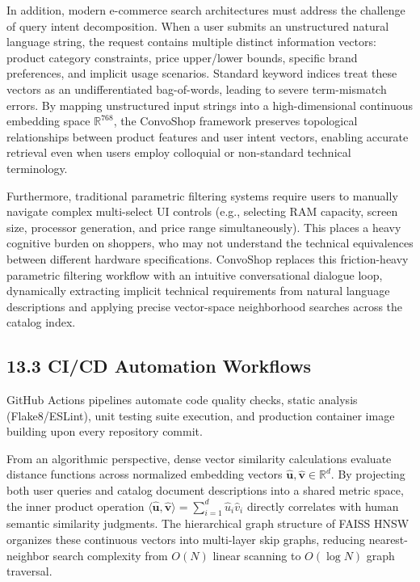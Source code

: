 \documentclass[12pt,a4paper]{article}
\begin{document}
In addition, modern e-commerce search architectures must address the challenge of query intent decomposition. When a user submits an unstructured natural language string, the request contains multiple distinct information vectors: product category constraints, price upper/lower bounds, specific brand preferences, and implicit usage scenarios. Standard keyword indices treat these vectors as an undifferentiated bag-of-words, leading to severe term-mismatch errors. By mapping unstructured input strings into a high-dimensional continuous embedding space $\mathbb{R}^{768}$, the ConvoShop framework preserves topological relationships between product features and user intent vectors, enabling accurate retrieval even when users employ colloquial or non-standard technical terminology.

Furthermore, traditional parametric filtering systems require users to manually navigate complex multi-select UI controls (e.g., selecting RAM capacity, screen size, processor generation, and price range simultaneously). This places a heavy cognitive burden on shoppers, who may not understand the technical equivalences between different hardware specifications. ConvoShop replaces this friction-heavy parametric filtering workflow with an intuitive conversational dialogue loop, dynamically extracting implicit technical requirements from natural language descriptions and applying precise vector-space neighborhood searches across the catalog index.

\subsection*{13.3 CI/CD Automation Workflows}
\label{sec:13.3}
GitHub Actions pipelines automate code quality checks, static analysis (Flake8/ESLint), unit testing suite execution, and production container image building upon every repository commit.



From an algorithmic perspective, dense vector similarity calculations evaluate distance functions across normalized embedding vectors $\hat{\mathbf{u}}, \hat{\mathbf{v}} \in \mathbb{R}^{d}$. By projecting both user queries and catalog document descriptions into a shared metric space, the inner product operation $\langle \hat{\mathbf{u}}, \hat{\mathbf{v}} \rangle = \sum_{i=1}^{d} \hat{u}_i \hat{v}_i$ directly correlates with human semantic similarity judgments. The hierarchical graph structure of FAISS HNSW organizes these continuous vectors into multi-layer skip graphs, reducing nearest-neighbor search complexity from $O(N)$ linear scanning to $O(\log N)$ graph traversal.
\end{document}
